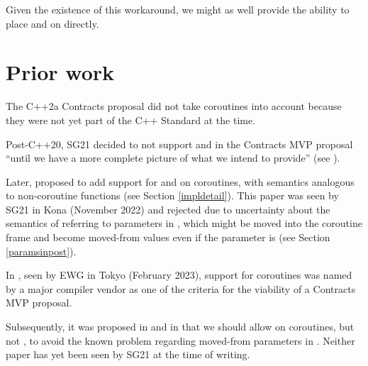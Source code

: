 

Given the existence of this workaround, we might as well provide the ability to place  and  on  directly.

\section{Prior work}

The C++2a Contracts proposal \cite{P0542R5} did not take coroutines into account because they were not yet part of the C++ Standard at the time.

Post-C++20, SG21 decided to not support  and  in the Contracts MVP proposal ``until we have a more complete picture of what we intend to provide'' (see \cite{P2932R3}).

Later, \cite{P2957R0} proposed to add support for  and  on coroutines, with semantics analogous to non-coroutine functions (see Section \ref{impldetail}). This paper was seen by SG21 in Kona (November 2022) and rejected due to uncertainty about the semantics of referring to parameters in , which might be moved into the coroutine frame and become moved-from values even if the parameter is  (see Section \ref{paramsinpost}).

In \cite{P3173R0}, seen by EWG in Tokyo (February 2023), support for coroutines was named by a major compiler vendor as one of the criteria for the viability of a Contracts MVP proposal.

Subsequently, it was proposed in \cite{P2957R1} and in \cite{P3251R0} that we should allow  on coroutines, but not , to avoid the known problem regarding moved-from parameters in . Neither paper has yet been seen by SG21 at the time of writing.

